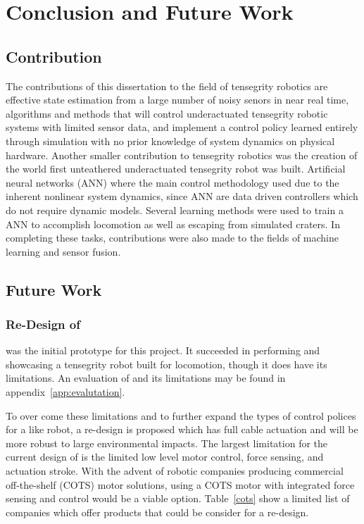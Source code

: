 \chapter{Conclusion and Future Work}
\label{conclusion}

\section{Contribution}
The contributions of this dissertation to the field of tensegrity robotics are effective state estimation from a large number of noisy senors in near real time, algorithms and methods that will control underactuated tensegrity robotic systems with limited sensor data, and implement a control policy learned entirely through simulation with no prior knowledge of system dynamics on physical hardware.
Another smaller contribution to tensegrity robotics was the creation of the world first unteathered underactuated tensegrity robot was built.
Artificial neural networks (ANN) where the main control methodology used due to the inherent nonlinear system dynamics, since ANN are data driven controllers which do not require dynamic models.
Several learning methods were used to train a ANN to accomplish locomotion as well as escaping from simulated craters.
In completing these tasks, contributions were also made to the fields of machine learning and sensor fusion.

\section{Future Work}

\subsection{Re-Design of \SB{}}
\label{sec:sbv2}
\SB{} was the initial prototype for this project.
It succeeded in performing and showcasing a tensegrity robot built for locomotion, though it does have its limitations.
An evaluation of \SB{} and its limitations may be found in appendix~\ref{app:evalutation}. 

To over come these limitations and to further expand the types of control polices for a \SB{} like robot, a re-design is proposed which has full cable actuation and will be more robust to large environmental impacts.
The largest limitation for the current design of \SB{} is the limited low level motor control, force sensing, and actuation stroke.
With the advent of robotic companies producing commercial off-the-shelf (COTS) motor solutions, using a COTS motor with integrated force sensing and control would be a viable option.
Table~\ref{cots} show a limited list of companies which offer products that could be consider for a \SB{} re-design.

